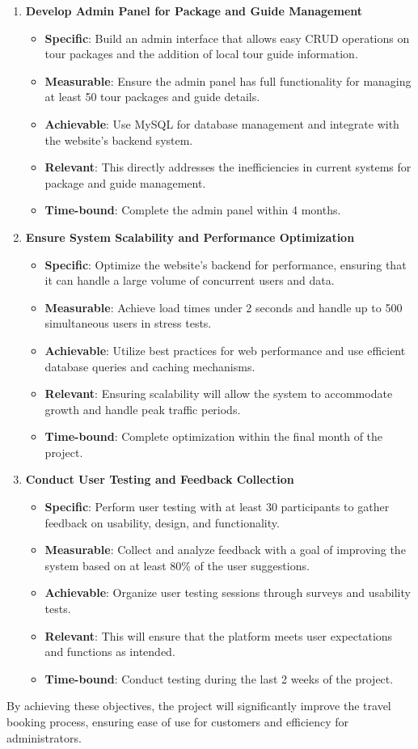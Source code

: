 \begin{enumerate}
    \item \textbf{Develop Admin Panel for Package and Guide Management}  
    \begin{itemize}
        \item \textbf{Specific}: Build an admin interface that allows easy CRUD operations on tour packages and the addition of local tour guide information.  
        \item \textbf{Measurable}: Ensure the admin panel has full functionality for managing at least 50 tour packages and guide details.  
        \item \textbf{Achievable}: Use MySQL for database management and integrate with the website’s backend system.  
        \item \textbf{Relevant}: This directly addresses the inefficiencies in current systems for package and guide management.  
        \item \textbf{Time-bound}: Complete the admin panel within 4 months.
    \end{itemize}

    \item \textbf{Ensure System Scalability and Performance Optimization}  
    \begin{itemize}
        \item \textbf{Specific}: Optimize the website's backend for performance, ensuring that it can handle a large volume of concurrent users and data.  
        \item \textbf{Measurable}: Achieve load times under 2 seconds and handle up to 500 simultaneous users in stress tests.  
        \item \textbf{Achievable}: Utilize best practices for web performance and use efficient database queries and caching mechanisms.  
        \item \textbf{Relevant}: Ensuring scalability will allow the system to accommodate growth and handle peak traffic periods.  
        \item \textbf{Time-bound}: Complete optimization within the final month of the project.
    \end{itemize}

    \item \textbf{Conduct User Testing and Feedback Collection}  
    \begin{itemize}
        \item \textbf{Specific}: Perform user testing with at least 30 participants to gather feedback on usability, design, and functionality.  
        \item \textbf{Measurable}: Collect and analyze feedback with a goal of improving the system based on at least 80\% of the user suggestions.  
        \item \textbf{Achievable}: Organize user testing sessions through surveys and usability tests.  
        \item \textbf{Relevant}: This will ensure that the platform meets user expectations and functions as intended.  
        \item \textbf{Time-bound}: Conduct testing during the last 2 weeks of the project.
    \end{itemize}
\end{enumerate}

By achieving these objectives, the project will significantly improve the travel booking process, ensuring ease of use for customers and efficiency for administrators.
